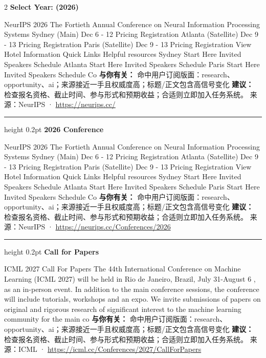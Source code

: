 \documentclass[10.5pt]{ctexart}
\begin{document}
\begin{multicols}{2}
{\large\bfseries Select Year: (2026)}\par
NeurIPS 2026 The Fortieth Annual Conference on Neural Information Processing Systems Sydney (Main) Dec 6 - 12 Pricing Registration Atlanta (Satellite) Dec 9 - 13 Pricing Registration Paris (Satellite) Dec 9 - 13 Pricing Registration View Hotel Information Quick Links Helpful resources Sydney Start Here Invited Speakers Schedule Atlanta Start Here Invited Speakers Schedule Paris Start Here Invited Speakers Schedule Co
\textbf{与你有关：} 命中用户订阅版面：research、opportunity、ai；来源接近一手且权威度高；标题/正文包含高信号变化
\textbf{建议：} 检查报名资格、截止时间、参与形式和预期收益；合适则立即加入任务系统。
{\footnotesize\color{ormuted} 来源：NeurIPS · \url{https://neurips.cc/}}
\vspace{2mm}
\hrule height 0.2pt
\vspace{2mm}
{\large\bfseries 2026 Conference}\par
NeurIPS 2026 The Fortieth Annual Conference on Neural Information Processing Systems Sydney (Main) Dec 6 - 12 Pricing Registration Atlanta (Satellite) Dec 9 - 13 Pricing Registration Paris (Satellite) Dec 9 - 13 Pricing Registration View Hotel Information Quick Links Helpful resources Sydney Start Here Invited Speakers Schedule Atlanta Start Here Invited Speakers Schedule Paris Start Here Invited Speakers Schedule Co
\textbf{与你有关：} 命中用户订阅版面：research、opportunity、ai；来源接近一手且权威度高；标题/正文包含高信号变化
\textbf{建议：} 检查报名资格、截止时间、参与形式和预期收益；合适则立即加入任务系统。
{\footnotesize\color{ormuted} 来源：NeurIPS · \url{https://neurips.cc/Conferences/2026}}
\vspace{2mm}
\hrule height 0.2pt
\vspace{2mm}
{\large\bfseries Call for Papers}\par
ICML 2027 Call For Papers The 44th International Conference on Machine Learning (ICML 2027) will be held in Rio de Janeiro, Brazil, July 31-August 6 , as an in-person event. In addition to the main conference sessions, the conference will include tutorials, workshops and an expo. We invite submissions of papers on original and rigorous research of significant interest to the machine learning community for the main co
\textbf{与你有关：} 命中用户订阅版面：research、opportunity、ai；来源接近一手且权威度高；标题/正文包含高信号变化
\textbf{建议：} 检查报名资格、截止时间、参与形式和预期收益；合适则立即加入任务系统。
{\footnotesize\color{ormuted} 来源：ICML · \url{https://icml.cc/Conferences/2027/CallForPapers}}

\end{multicols}
\end{document}
